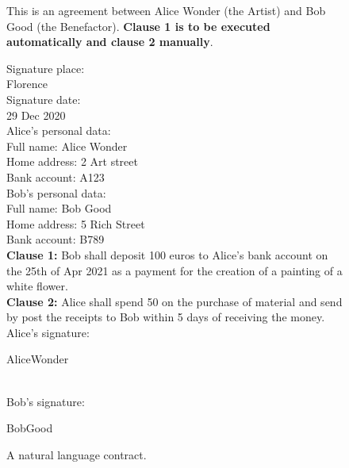 \documentclass[12pt]{report} %
\begin{document}
\begin{figure}
\begin{tcolorbox}[width=\textwidth,
   title={This is a contract between Alice and Bob.},
   colframe=black!75!white,
   colbacktitle=gray!50!white, coltitle=black,
   colupper=black,    colback=green!5!white]

 This is an agreement between Alice Wonder (the Artist) 
 and Bob Good (the Benefactor). \textbf{Clause 1 is to be
 executed automatically and clause 2 manually}.

\vspace{0.5cm}
Signature place: \\
Florence\\

Signature date:\\ 
29 Dec 2020 \\

Alice's personal data: \\
Full name:  Alice Wonder \\
Home address: 2 Art street \\
Bank account: A123 \\

Bob's personal data: \\
Full name: Bob Good \\
Home address: 5 Rich Street \\
Bank account: B789 \\


\textbf{Clause 1:} Bob shall deposit 100 euros to 
Alice's bank account on the 25th of Apr 2021 as a 
payment for the creation of a painting of a
white flower.  \\

\textbf{Clause 2:} Alice shall spend 50 on the purchase 
of material and send by post the receipts to Bob 
within 5 days of receiving the money. \\
 
\vspace{0.5 cm}
Alice's signature: \begin{wedn}AliceWonder\end{wedn} \\
      
Bob's signature: \begin{wedn}BobGood\end{wedn}

\end{tcolorbox}
\caption{A natural language contract.}
\label{box:contnaturallang}
\end{figure}
\end{document}
